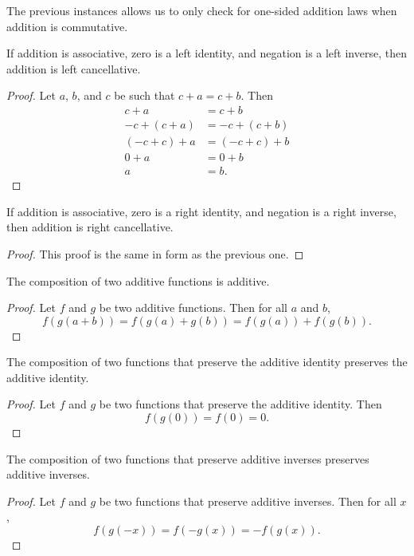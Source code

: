 \documentclass[../math.tex]{subfiles}
\begin{document}
The previous instances allows us to only check for one-sided addition laws when
addition is commutative.

\begin{instance} \label{plus_linv_lcancel}
    If addition is associative, zero is a left identity, and negation is a left
    inverse, then addition is left cancellative.
\end{instance}
\begin{proof}
    Let $a$, $b$, and $c$ be such that $c + a = c + b$.  Then
    \begin{align*}
        c + a &= c + b \\
        -c + (c + a) &= -c + (c + b) \\
        (-c + c) + a &= (-c + c) + b \\
        0 + a &= 0 + b \\
        a &= b.
    \end{align*}
\end{proof}

\begin{instance} \label{plus_rinv_rcancel}
    If addition is associative, zero is a right identity, and negation is a
    right inverse, then addition is right cancellative.
\end{instance}
\begin{proof}
    This proof is the same in form as the previous one.
\end{proof}

\begin{instance}
    The composition of two additive functions is additive.
\end{instance}
\begin{proof}
    Let $f$ and $g$ be two additive functions.  Then for all $a$ and $b$,
    \[
        f(g(a + b)) = f(g(a) + g(b)) = f(g(a)) + f(g(b)).
    \]
\end{proof}

\begin{instance}
    The composition of two functions that preserve the additive identity
    preserves the additive identity.
\end{instance}
\begin{proof}
    Let $f$ and $g$ be two functions that preserve the additive identity.  Then
    \[
        f(g(0)) = f(0) = 0.
    \]
\end{proof}

\begin{instance}
    The composition of two functions that preserve additive inverses preserves
    additive inverses.
\end{instance}
\begin{proof}
    Let $f$ and $g$ be two functions that preserve additive inverses.  Then for
    all $x$,
    \[
        f(g(-x)) = f(-g(x)) = -f(g(x)).
    \]
\end{proof}
\end{document}
